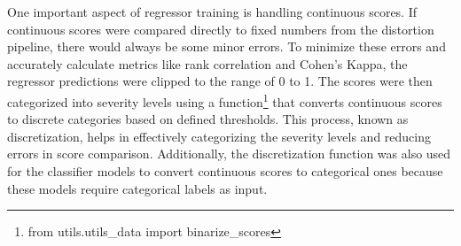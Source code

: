 One important aspect of regressor training is handling continuous scores. If continuous scores were compared directly to fixed numbers from the distortion pipeline, there would always be some minor errors. To minimize these errors and accurately calculate metrics like rank correlation and Cohen’s Kappa, the regressor predictions were clipped to the range of 0 to 1. The scores were then categorized into severity levels using a function\footnote{from utils.utils\_data import binarize\_scores} that converts continuous scores to discrete categories based on defined thresholds. This process, known as discretization, helps in effectively categorizing the severity levels and reducing errors in score comparison. Additionally, the discretization function was also used for the classifier models to convert continuous scores to categorical ones because these models require categorical labels as input. \par

